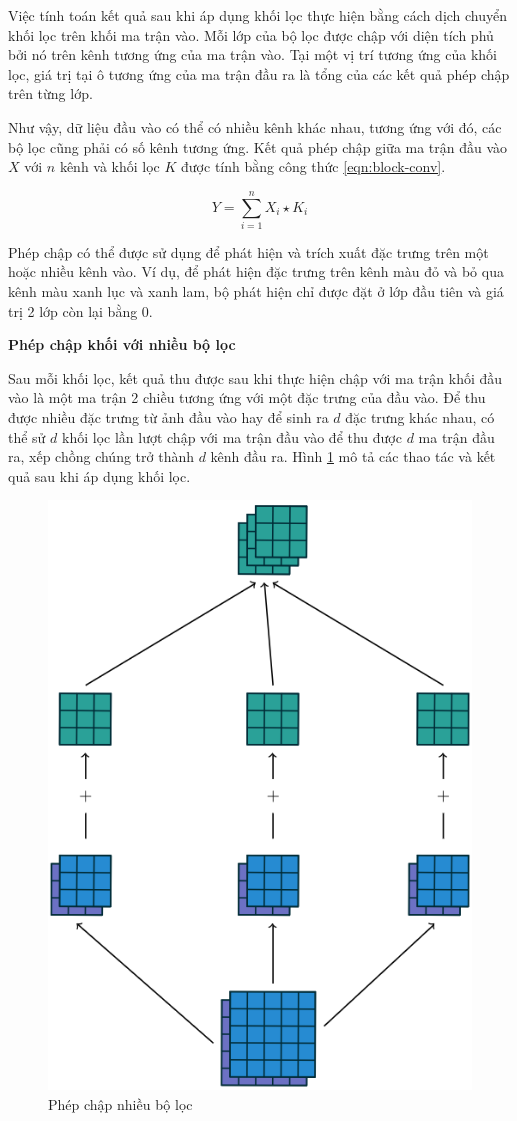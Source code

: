 Việc tính toán kết quả sau khi áp dụng khối lọc thực hiện bằng cách dịch chuyển khối lọc trên khối ma trận vào. Mỗi lớp của bộ lọc được chập với diện tích phủ bởi nó trên kênh tương ứng của ma trận vào. Tại một vị trí tương ứng của khối lọc, giá trị tại ô tương ứng của ma trận đầu ra là tổng của các kết quả phép chập trên từng lớp.

Như vậy, dữ liệu đầu vào có thể có nhiều kênh khác nhau, tương ứng với đó, các bộ lọc cũng phải có số kênh tương ứng. Kết quả phép chập giữa ma trận đầu vào $X$ với $n$ kênh và khối lọc $K$ được tính bằng công thức \ref{eqn:block-conv}.

\begin{equation}\label{eqn:block-conv}
	Y = \sum^n_{i=1}X_i\star K_i
\end{equation}

Phép chập có thể được sử dụng để phát hiện và trích xuất đặc trưng trên một hoặc nhiều kênh vào. Ví dụ, để phát hiện đặc trưng trên kênh màu đỏ và bỏ qua kênh màu xanh lục và xanh lam, bộ phát hiện chỉ được đặt ở lớp đầu tiên và giá trị 2 lớp còn lại bằng 0.



\textbf{Phép chập khối với nhiều bộ lọc}

Sau mỗi khối lọc, kết quả thu được sau khi thực hiện chập với ma trận khối đầu vào là một ma trận 2 chiều tương ứng với một đặc trưng của đầu vào. Để thu được nhiều đặc trưng từ ảnh đầu vào hay để sinh ra $d$ đặc trưng khác nhau, có thể sử $d$ khối lọc lần lượt chập với ma trận đầu vào để thu được $d$ ma trận đầu ra, xếp chồng chúng trở thành $d$ kênh đầu ra. Hình \ref{fig:multiple-filter-block-conv} mô tả các thao tác và kết quả sau khi áp dụng khối lọc.

\begin{figure}[h]
	\centering
	\includegraphics[width=0.6\linewidth]{images/multiple-filter-block-conv}
	\caption{Phép chập nhiều bộ lọc \cite{wei2021}}
	\label{fig:multiple-filter-block-conv}
\end{figure}

